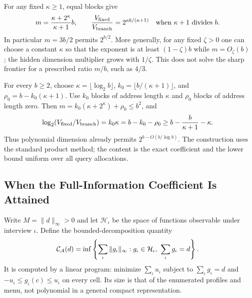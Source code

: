 For any fixed $\kappa\ge1$, equal blocks give
\[
 m=\frac{\kappa+2^\kappa}{\kappa+1}b,\qquad
 \frac{V_{\rm fixed}}{V_{\rm branch}}=2^{\kappa b/(\kappa+1)}
 \quad\text{when }\kappa+1\text{ divides }b.
\]
In particular $m=3b/2$ permits $2^{b/2}$. More generally, for any fixed $\zeta>0$ one can choose a constant $\kappa$ so that the exponent is at least $(1-\zeta)b$ while $m=O_\zeta(b)$; the hidden dimension multiplier grows with $1/\zeta$. This does not solve the sharp frontier for a prescribed ratio $m/b$, such as $4/3$.

For every $b\ge2$, choose $\kappa=\lfloor\log_2 b\rfloor$, $k_0=\lfloor b/(\kappa+1)\rfloor$, and $\rho_0=b-k_0(\kappa+1)$. Use $k_0$ blocks of address length $\kappa$ and $\rho_0$ blocks of address length zero. Then $m=k_0(\kappa+2^\kappa)+\rho_0\le b^2$, and
\[
 \log_2(V_{\rm fixed}/V_{\rm branch})
 =k_0\kappa=b-k_0-\rho_0
 \ge b-\frac{b}{\kappa+1}-\kappa.
\]
Thus polynomial dimension already permits $2^{b-O(b/\log b)}$. The construction uses the standard product method; the content is the exact coefficient and the lower bound uniform over all query allocations.

\subsection{When the Full-Information Coefficient Is Attained}\label{app:equality}
Write $M=\|d\|_\infty>0$ and let $\mathcal H_\iota$ be the space of functions observable under interview $\iota$. Define the bounded-decomposition quantity
\[
 \mathcal C_\mathcal A(d)=\inf\left\{\sum_\iota\|g_\iota\|_\infty:
       g_\iota\in\mathcal H_\iota,\ \sum_\iota g_\iota=d\right\}.
\]
It is computed by a linear program: minimize $\sum_\iota u_\iota$ subject to $\sum_\iota g_\iota=d$ and $-u_\iota\le g_\iota(c)\le u_\iota$ on every cell. Its size is that of the enumerated profiles and menu, not polynomial in a general compact representation.

